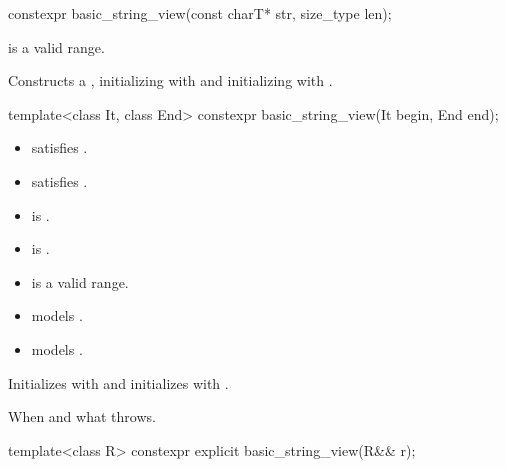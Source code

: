 %
\begin{itemdecl}
constexpr basic_string_view(const charT* str, size_type len);
\end{itemdecl}

\begin{itemdescr}
\pnum
\expects
{} is a valid range.

\pnum
\effects
Constructs a , initializing  with 
and initializing  with .
\end{itemdescr}

%
\begin{itemdecl}
template<class It, class End>
  constexpr basic_string_view(It begin, End end);
\end{itemdecl}

\begin{itemdescr}
\pnum
\constraints
\begin{itemize}
\item {} satisfies .
\item {} satisfies .
\item {} is .
\item {} is .
\end{itemize}

\pnum
\expects
\begin{itemize}
\item {} is a valid range.
\item {} models .
\item {} models .
\end{itemize}

\pnum
\effects
Initializes  with  and
initializes  with .

\pnum
\throws
When and what  throws.
\end{itemdescr}

%
\begin{itemdecl}
template<class R>
  constexpr explicit basic_string_view(R&& r);
\end{itemdecl}

